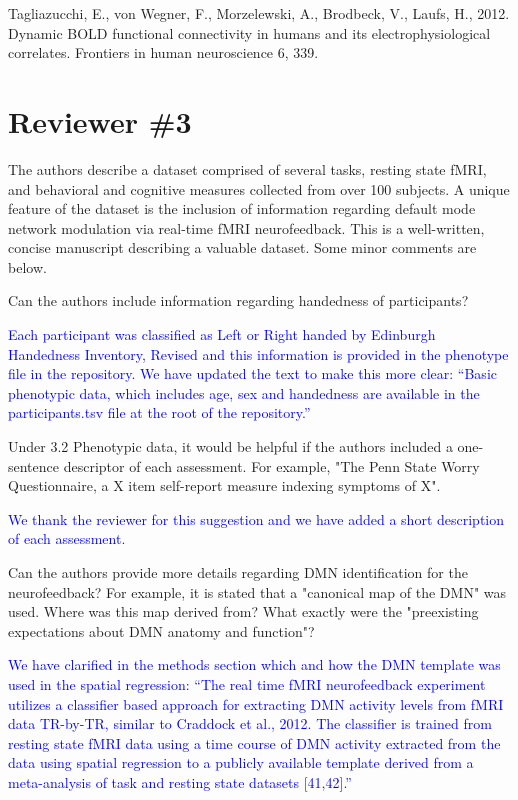 \documentclass{article}
\newcommand{\RESPONSE}[1]{\textcolor{blue}{#1}}
\begin{document}
Tagliazucchi, E., von Wegner, F., Morzelewski, A., Brodbeck, V., Laufs, H., 2012. Dynamic BOLD functional connectivity in humans and its electrophysiological correlates. Frontiers in human neuroscience 6, 339.

\section*{Reviewer \#3}

The authors describe a dataset comprised of several tasks, resting state fMRI, and behavioral and cognitive measures collected from over 100 subjects. A unique feature of the dataset is the inclusion of information regarding default mode network modulation via real-time fMRI neurofeedback. This is a well-written, concise manuscript describing a valuable dataset. Some minor comments are below.

Can the authors include information regarding handedness of participants?

\RESPONSE{Each participant was classified as Left or Right handed by Edinburgh Handedness Inventory, Revised and this information is provided in the phenotype file in the repository. We have updated the text to make this more clear: ``Basic phenotypic data, which includes age, sex and handedness are available in the participants.tsv file at the root of the repository.''}

Under 3.2 Phenotypic data, it would be helpful if the authors included a one-sentence descriptor of each assessment. For example, "The Penn State Worry Questionnaire, a X item self-report measure indexing symptoms of X".

\RESPONSE{We thank the reviewer for this suggestion and we have added a short description of each assessment.}

Can the authors provide more details regarding DMN identification for the neurofeedback? For example, it is stated that a "canonical map of the DMN" was used. Where was this map derived from? What exactly were the "preexisting expectations about DMN anatomy and function"?

\RESPONSE{We have clarified in the methods section which and how the DMN template was used in the spatial regression: ``The real time fMRI neurofeedback experiment utilizes a classifier based approach for extracting DMN activity levels from fMRI data TR-by-TR, similar to Craddock et al., 2012. The classifier is trained from resting state fMRI data using a time course of DMN activity extracted from the data using spatial regression to a publicly available template derived from a meta-analysis of task and resting state datasets [41,42].'' }
\end{document}
